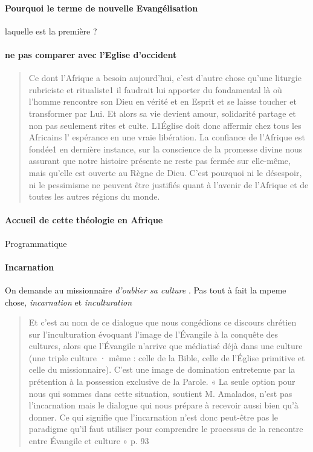 \paragraph{Pourquoi le terme de nouvelle Evangélisation} laquelle est la première ?

\paragraph{ne pas comparer avec l'Eglise d'occident} 
\begin{Ex}
\begin{quote}
    Ce dont l'Afrique a besoin aujourd'hui, c'est d'autre chose
qu'une liturgie rubriciste et ritualiste1 il faudrait lui apporter du
fondamental là où l'homme rencontre son Dieu en vérité et en
Esprit et se laisse toucher et transformer par Lui. Et alors sa vie
devient amour, solidarité partage et non pas seulement rites et
culte. L1Église doit donc affermir chez tous les Africains l' espérance
en une vraie libération. La confiance de l'Afrique est fondée1
en dernière instance, sur la conscience de la promesse divine
nous assurant que notre histoire présente ne reste pas fermée
sur elle-même, mais qu'elle est ouverte au Règne de Dieu. C'est
pourquoi ni le désespoir, ni le pessimisme ne peuvent être justifiés
quant à l'avenir de l'Afrique et de toutes les autres régions
du monde.
\end{quote}
    
\end{Ex}


\paragraph{Accueil de cette théologie en Afrique} Programmatique

\paragraph{Incarnation} On demande au missionnaire \textit{d'oublier sa culture} . Pas tout à fait la mpeme chose, \textit{incarnation} et \textit{inculturation}

\begin{quote}
    Et c'est au nom de ce dialogue que nous congédions ce
discours chrétien sur l'inculturation évoquant l'image de
l'Évangile à la conquête des cultures, alors que l'Évangile
n'arrive que médiatisé déjà dans une culture (une triple culture
· même : celle de la Bible, celle de l'Église primitive et celle du
missionnaire). C'est une image de domination entretenue par la
prétention à la possession exclusive de la Parole. « La seule
option pour nous qui sommes dans cette situation, soutient
M. Amalados, n'est pas l'incarnation mais le dialogue qui nous
prépare à recevoir aussi bien qu'à donner. Ce qui signifie que
l'incarnation n'est donc peut-être pas le paradigme qu'il faut
utiliser pour comprendre le processus de la rencontre entre
Évangile et culture » p. 93
\end{quote}

